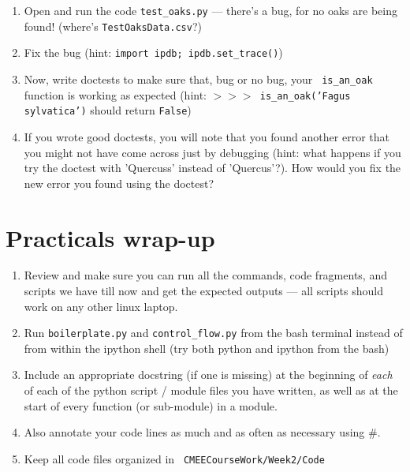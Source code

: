 \begin{enumerate} \itemsep8pt
	\item Open and run the code {\tt test\_oaks.py} --- there's a bug, 
	for no oaks are being found! (where's {\tt TestOaksData.csv}?)

  \item Fix the bug (hint: {\tt import ipdb; ipdb.set\_trace()})

	\item Now, write doctests to make sure that, bug or no bug, your {\tt 
	is\_an\_oak} function is working as expected (hint: {\tt $>>>$ 
	is\_an\_oak('Fagus sylvatica')} should return {\tt False})

	\item If you wrote good doctests, you will note that you found 
	another error that you might not have come across just by debugging
	(hint: what happens if you try the doctest with 'Quercuss' instead of
	'Quercus'?). How would you fix the new error you found using the 
	doctest? 

\end{enumerate}

\section{Practicals wrap-up}

  \begin{enumerate}

	\item Review and make sure you can run all the commands, code 
	fragments, and scripts we have till now and get the expected outputs 
	--- all scripts should work on any other linux laptop.

	\item Run {\tt boilerplate.py} and {\tt control\_flow.py} from 
	the bash terminal instead of from within the ipython shell (try 
	both python and ipython from the bash)
	
	\item Include an appropriate docstring (if one is missing) at the 
	beginning of {\it each} of each of the python script / module files 
	you have written, as well as at the start of every function (or 
	sub-module) in a module.

	\item Also annotate your code lines as much and as often as necessary 
	using \#.
	
	\item Keep all code files organized in {\tt 
	CMEECourseWork/Week2/Code}
	 
   \end{enumerate}

